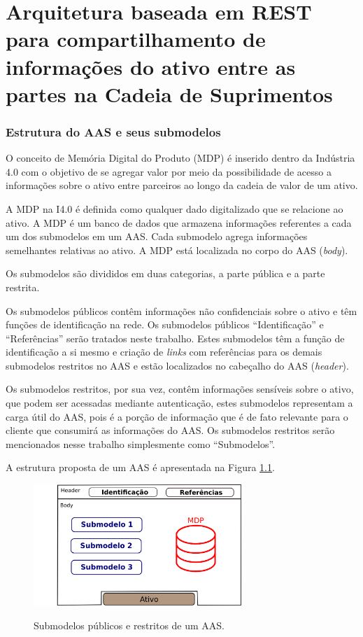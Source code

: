 \documentclass[
	12pt,				%
	oneside,			%
	a4paper,			%
	english,			%
	brazil				%
]{abntex2}
\begin{document}
\chapter{Arquitetura baseada em REST para compartilhamento de informações do ativo entre as partes na Cadeia de Suprimentos}

	\subsection{Estrutura do AAS e seus submodelos}

	O conceito de Memória Digital do Produto (MDP) é inserido dentro da Indústria 4.0 com o objetivo de se agregar valor por meio da possibilidade de acesso a informações sobre o ativo entre parceiros ao longo da cadeia de valor de um ativo.
	
	A MDP na I4.0 é definida como qualquer dado digitalizado que se relacione ao ativo. A MDP é um banco de dados que armazena informações referentes a cada um dos submodelos em um AAS. Cada submodelo agrega informações semelhantes relativas ao ativo. A MDP está localizada no corpo do AAS (\textit{body}).
	
	Os submodelos são divididos em duas categorias, a parte pública e a parte restrita.
	
	Os submodelos públicos contêm informações não confidenciais sobre o ativo e têm funções de identificação na rede. Os submodelos públicos ``Identificação'' e ``Referências'' serão tratados neste trabalho. Estes submodelos têm a função de identificação a si mesmo e criação de \textit{links} com referências para os demais submodelos restritos no AAS e estão localizados no cabeçalho do AAS (\textit{header}).
	
	Os submodelos restritos, por sua vez, contêm informações sensíveis sobre o ativo, que podem ser acessadas mediante autenticação, estes submodelos representam a carga útil do AAS, pois é a porção de informação que é de fato relevante para o cliente que consumirá as informações do AAS. Os submodelos restritos serão mencionados nesse trabalho simplesmente como ``Submodelos''.
	
	A estrutura proposta de um AAS é apresentada na Figura \ref{fig:submodelos-publicos-e-restritos}.
	
	\begin{figure}[H]
		\centering
		\caption{Submodelos públicos e restritos de um AAS.}
		\includegraphics[width=0.7\textwidth]{submodelos-publicos-e-restritos.png}
		\label{fig:submodelos-publicos-e-restritos}
	\end{figure}
\end{document}

